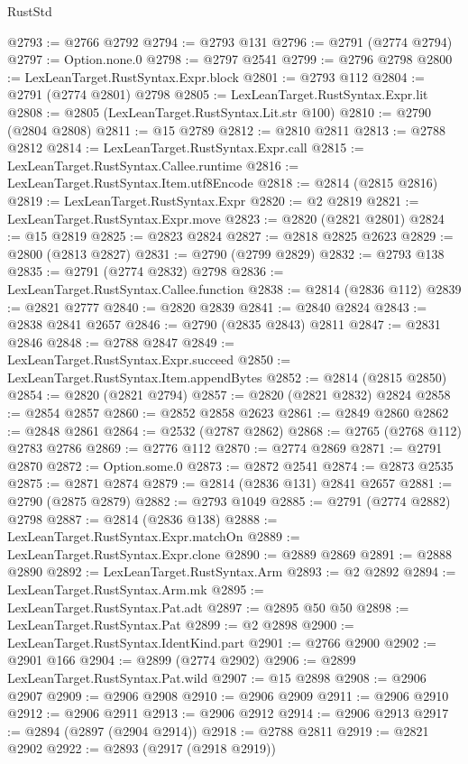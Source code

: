 \begin{lexlean}{RustStd}
\begin{coremodule}
@2793 := @2766 @2792
@2794 := @2793 @131
@2796 := @2791 (@2774 @2794)
@2797 := Option.none.{0}
@2798 := @2797 @2541
@2799 := @2796 @2798
@2800 := LexLeanTarget.RustSyntax.Expr.block
@2801 := @2793 @112
@2804 := @2791 (@2774 @2801) @2798
@2805 := LexLeanTarget.RustSyntax.Expr.lit
@2808 := @2805 (LexLeanTarget.RustSyntax.Lit.str @100)
@2810 := @2790 (@2804 @2808)
@2811 := @15 @2789
@2812 := @2810 @2811
@2813 := @2788 @2812
@2814 := LexLeanTarget.RustSyntax.Expr.call
@2815 := LexLeanTarget.RustSyntax.Callee.runtime
@2816 := LexLeanTarget.RustSyntax.Item.utf8Encode
@2818 := @2814 (@2815 @2816)
@2819 := LexLeanTarget.RustSyntax.Expr
@2820 := @2 @2819
@2821 := LexLeanTarget.RustSyntax.Expr.move
@2823 := @2820 (@2821 @2801)
@2824 := @15 @2819
@2825 := @2823 @2824
@2827 := @2818 @2825 @2623
@2829 := @2800 (@2813 @2827)
@2831 := @2790 (@2799 @2829)
@2832 := @2793 @138
@2835 := @2791 (@2774 @2832) @2798
@2836 := LexLeanTarget.RustSyntax.Callee.function
@2838 := @2814 (@2836 @112)
@2839 := @2821 @2777
@2840 := @2820 @2839
@2841 := @2840 @2824
@2843 := @2838 @2841 @2657
@2846 := @2790 (@2835 @2843) @2811
@2847 := @2831 @2846
@2848 := @2788 @2847
@2849 := LexLeanTarget.RustSyntax.Expr.succeed
@2850 := LexLeanTarget.RustSyntax.Item.appendBytes
@2852 := @2814 (@2815 @2850)
@2854 := @2820 (@2821 @2794)
@2857 := @2820 (@2821 @2832) @2824
@2858 := @2854 @2857
@2860 := @2852 @2858 @2623
@2861 := @2849 @2860
@2862 := @2848 @2861
@2864 := @2532 (@2787 @2862)
@2868 := @2765 (@2768 @112) @2783 @2786
@2869 := @2776 @112
@2870 := @2774 @2869
@2871 := @2791 @2870
@2872 := Option.some.{0}
@2873 := @2872 @2541
@2874 := @2873 @2535
@2875 := @2871 @2874
@2879 := @2814 (@2836 @131) @2841 @2657
@2881 := @2790 (@2875 @2879)
@2882 := @2793 @1049
@2885 := @2791 (@2774 @2882) @2798
@2887 := @2814 (@2836 @138)
@2888 := LexLeanTarget.RustSyntax.Expr.matchOn
@2889 := LexLeanTarget.RustSyntax.Expr.clone
@2890 := @2889 @2869
@2891 := @2888 @2890
@2892 := LexLeanTarget.RustSyntax.Arm
@2893 := @2 @2892
@2894 := LexLeanTarget.RustSyntax.Arm.mk
@2895 := LexLeanTarget.RustSyntax.Pat.adt
@2897 := @2895 @50 @50
@2898 := LexLeanTarget.RustSyntax.Pat
@2899 := @2 @2898
@2900 := LexLeanTarget.RustSyntax.IdentKind.part
@2901 := @2766 @2900
@2902 := @2901 @166
@2904 := @2899 (@2774 @2902)
@2906 := @2899 LexLeanTarget.RustSyntax.Pat.wild
@2907 := @15 @2898
@2908 := @2906 @2907
@2909 := @2906 @2908
@2910 := @2906 @2909
@2911 := @2906 @2910
@2912 := @2906 @2911
@2913 := @2906 @2912
@2914 := @2906 @2913
@2917 := @2894 (@2897 (@2904 @2914))
@2918 := @2788 @2811
@2919 := @2821 @2902
@2922 := @2893 (@2917 (@2918 @2919))

\end{coremodule}
\end{lexlean}
